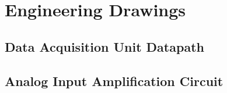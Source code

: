 \section{Engineering Drawings}
\subsection{Data Acquisition Unit Datapath}
\label{sch:datapath}


\subsection{Analog Input Amplification Circuit}
\label{sch:signal amp}

